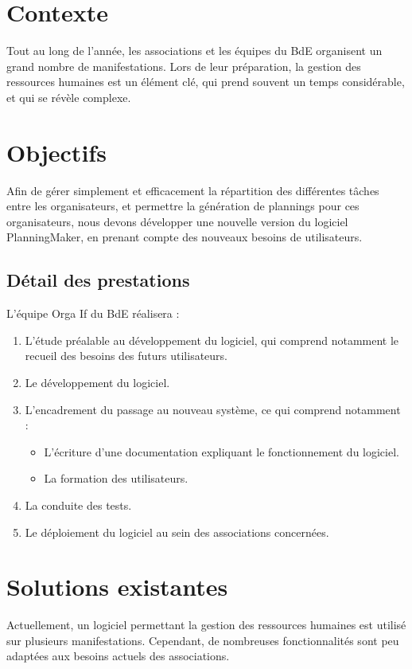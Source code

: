 \section{Contexte}
Tout au long de l'année, les associations et les équipes du BdE organisent un grand nombre de manifestations. Lors de leur préparation, la gestion des ressources humaines est un
 élément clé, qui prend souvent un temps considérable, et qui se révèle complexe.


\section{Objectifs}
Afin de gérer simplement et efficacement la répartition des différentes tâches entre les organisateurs, et permettre la génération de plannings pour ces organisateurs, nous devons
développer une nouvelle version du logiciel PlanningMaker, en prenant compte des nouveaux besoins de utilisateurs.

\subsection{Détail des prestations}
L'équipe Orga If du BdE réalisera :
\begin{enumerate}
 \item L'étude préalable au développement du logiciel, qui comprend notamment le recueil des besoins des futurs utilisateurs.
\item Le développement du logiciel.
\item L'encadrement du passage au nouveau système, ce qui comprend notamment : \begin{itemize}
                                                                                \item L'écriture d'une documentation expliquant le fonctionnement du logiciel.
\item La formation des utilisateurs.
                                                                               \end{itemize}
\item La conduite des tests.
\item Le déploiement du logiciel au sein des associations concernées.

\end{enumerate}


\section{Solutions existantes}
Actuellement, un logiciel permettant la gestion des ressources humaines est utilisé sur plusieurs manifestations. Cependant, de nombreuses fonctionnalités sont peu adaptées aux besoins actuels des associations.
